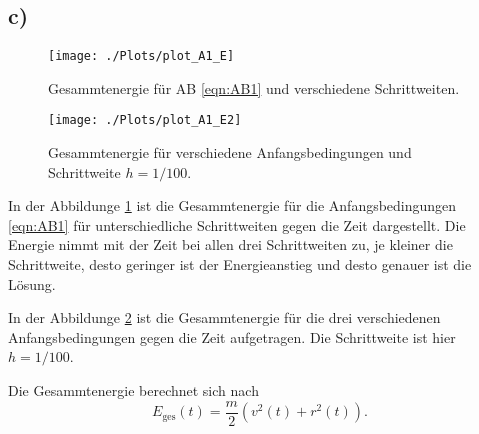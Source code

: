   \subsection*{c)}

    \begin{figure}
      \centering
      \texttt{[image: ./Plots/plot\_A1\_E]}
      \caption{Gesammtenergie für AB \ref{eqn:AB1} und verschiedene Schrittweiten.}
      \label{fig:A1E}
    \end{figure}
    \begin{figure}
      \centering
      \texttt{[image: ./Plots/plot\_A1\_E2]}
      \caption{Gesammtenergie für verschiedene Anfangsbedingungen und Schrittweite $h=1/100$.}
      \label{fig:A1E2}
    \end{figure}

    In der Abbildunge \ref{fig:A1E} ist die Gesammtenergie für die
    Anfangsbedingungen \ref{eqn:AB1} für unterschiedliche Schrittweiten
    gegen die Zeit dargestellt. Die Energie nimmt mit der Zeit bei allen drei
    Schrittweiten zu, je kleiner die Schrittweite, desto geringer ist der Energieanstieg
    und desto genauer ist die Lösung.

    In der Abbildunge \ref{fig:A1E2} ist die Gesammtenergie für die drei verschiedenen
    Anfangsbedingungen gegen die Zeit aufgetragen. Die Schrittweite ist hier $h=1/100$.

    Die Gesammtenergie berechnet sich nach
    \begin{equation}
      E_\text{ges}(t) = \frac{m}{2}(v^2(t)+r^2(t)).
    \end{equation}
